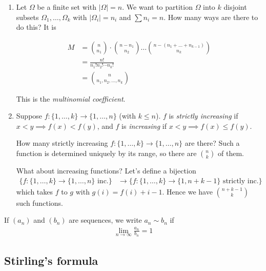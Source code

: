 \documentclass{../template/note}
\begin{document}
    \begin{enumerate}
        \item Let \(\Omega\) be a finite set with \(| \Omega|  = n\). We want to partition \(\Omega\) into \(k\) disjoint subsets \(\Omega_1, \dots, \Omega_k\) with \(| \Omega_i|  = n_i\) and \(\sum n_i = n\). How many ways are there to do this? It is

        \begin{align*}
            M &= \binom n {n_1} \cdot \binom {n-n_1} {n_2} \dots \binom{n-(n_1 + \dots + n_{k-1})}{n_k} \\
            &= \frac{n!}{n_1!n_2! \cdots n_k!} \\
            &= \binom{n}{n_1, n_2, \dots, n_k}
        \end{align*}
        
        This is the \emph{multinomial coefficient}.

        \item Suppose \(f: \{1, \dots, k\} \to \{1, \dots, n\}\) (with \(k \leq n\)). \(f\) is \emph{strictly increasing} if \(x < y \implies f(x) < f(y)\), and \(f\) is \emph{increasing} if \(x < y \implies f(x) \leq f(y)\).
        
        How many strictly increasing \(f: \{1, \dots, k\} \to \{1, \dots, n\}\) are there? Such a function is determined uniquely by its range, so there are \(\binom n k\) of them.

        What about increasing functions? Let's define a bijection
        \begin{align*}
            \{f: \{1, \dots, k\} \to \{1, \dots, n\}\text{ inc.}\} &\to \{f: \{1, \dots, k\} \to \{1, n+k-1\} \text{ strictly inc.}\}
        \end{align*}
        which takes \(f\) to \(g\) with \(g(i) = f(i) + i - 1\). Hence we have \(\binom{n+k-1}{k}\) such functions.
    \end{enumerate}

    \begin{definition}
        If \((a_n)\) and \((b_n)\) are sequences, we write \(a_n \sim b_n\) if
        \begin{align*}
            \lim_{n \to \infty} \frac{a_n}{b_n} = 1
        \end{align*}
    \end{definition}
    
    \subsection{Stirling's formula}
    
\end{document}
